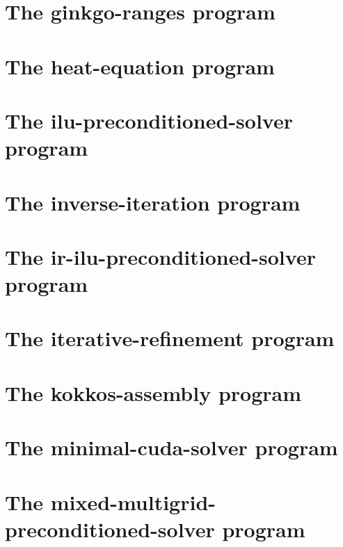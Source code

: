 \let\mypdfximage\pdfximage\def\pdfximage{\immediate\mypdfximage}\documentclass[twoside]{book}
\newcommand{\+}{\discretionary{\mbox{\scriptsize$\hookleftarrow$}}{}{}}
\begin{document}
\chapter{The ginkgo-\/ranges program}
\label{ginkgo_ranges}

\chapter{The heat-\/equation program}
\label{heat_equation}

\chapter{The ilu-\/preconditioned-\/solver program}
\label{ilu_preconditioned_solver}

\chapter{The inverse-\/iteration program}
\label{inverse_iteration}

\chapter{The ir-\/ilu-\/preconditioned-\/solver program}
\label{ir_ilu_preconditioned_solver}

\chapter{The iterative-\/refinement program}
\label{iterative_refinement}

\chapter{The kokkos-\/assembly program}
\label{kokkos_assembly}

\chapter{The minimal-\/cuda-\/solver program}
\label{minimal_cuda_solver}

\chapter{The mixed-\/multigrid-\/preconditioned-\/solver program}
\label{mixed_multigrid_preconditioned_solver}

\end{document}
